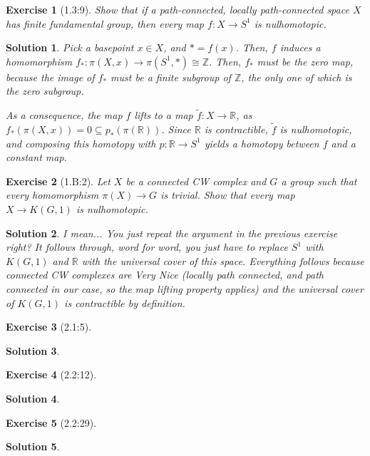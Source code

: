 \documentclass{article}
\theoremstyle{plain}
\newtheorem*{ex}{Exercise}
\theoremstyle{nonumberplain}
\newtheorem{sol}{Solution}
\newcommand{\R}{\mathbb{R}}
\newcommand{\Z}{\mathbb{Z}}
\begin{document}
\begin{ex}[1.3:9]
Show that if a path-connected, locally path-connected space $X$ has finite fundamental group, then every map $f \colon X \to S^1$ is nulhomotopic.
\end{ex}

\begin{sol}
Pick a basepoint $x \in X$, and $* = f(x)$. Then, $f$ induces a homomorphism $f_* \colon \pi(X,x) \to \pi(S^1,*) \cong \Z$. Then, $f_*$ must be the zero map, because the image of $f_*$ must be a finite subgroup of $\Z$, the only one of which is the zero subgroup.

As a consequence, the map $f$ lifts to a map $\tilde f \colon X \to \R$, as $f_*(\pi(X,x)) = 0 \subseteq p_*(\pi(\R))$. Since $\R$ is contractible, $\tilde f$ is nulhomotopic, and composing this homotopy with $p \colon \R \to S^1$ yields a homotopy between $f$ and a constant map.
\end{sol}

\begin{ex}[1.B:2]
Let $X$ be a connected CW complex and $G$ a group such that every homomorphism $\pi(X) \to G$ is trivial. Show that every map $X \to K(G,1)$ is nulhomotopic.
\end{ex}

\begin{sol}
I mean... You just repeat the argument in the previous exercise right? It follows through, word for word, you just have to replace $S^1$ with $K(G,1)$ and $\R$ with the universal cover of this space. Everything follows because connected CW complexes are Very Nice (locally path connected, and path connected in our case, so the map lifting property applies) and the universal cover of $K(G,1)$ is contractible by definition.
\end{sol}

\begin{ex}[2.1:5]

\end{ex}

\begin{sol}
\end{sol}

\begin{ex}[2.2:12]

\end{ex}

\begin{sol}
\end{sol}

\begin{ex}[2.2:29]

\end{ex}

\begin{sol}
\end{sol}
\end{document}
